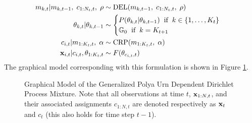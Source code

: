 \documentclass[twocolumn, final]{svjour3}
\begin{document}
\begin{align}
\label{gpuddpm_def}
\begin{split}
m_{k,t} | m_{k,t-1}, \hspace{1mm} c_{1:N_{t}, t}, \hspace{1mm} \rho  &\sim \text{DEL}(m_{k,t-1}, \hspace{1mm} c_{1:N_{t}, t}, \hspace{1mm} \rho) \\
\theta_{k, t} | \theta_{k, t-1}   &\sim
\begin{cases}
	P(\theta_{k, t} | \theta_{k, t-1}) \hspace{2mm} \text{if} \hspace{2mm} k \in \{ 1, \ldots, K_{t} \} \\
	\mathbb{G}_{0}   \hspace{2mm} \text{if} \hspace{2mm} k = K_{t+1}
\end{cases} \\
c_{i,t} | m_{1:K_{t},t}, \hspace{1mm} \alpha  &\sim  \text{CRP} (m_{1:K_{t},t}, \hspace{1mm} \alpha) \\
\bold{x}_{i,t} | c_{i,t}, \theta_{1:K_{t}, t} &\sim F(\theta_{c_{i,t}, t})
\end{split}
\end{align}
The graphical model corresponding with this formulation is shown in Figure \ref{fig:gpuddpm_gm_1}.
\begin{figure}[h]
        \caption{\label{fig:gpuddpm_gm_1} Graphical Model of the Generalized Polya Urn Dependent Dirichlet Process Mixture. Note that all observations at time $t$, $\bold{x}_{1:N,t}$, and their associated assignments $c_{1:N,t}$ are denoted respectively as $\bold{x}_{t}$ and $c_{t}$ (this also holds for time step $t-1$).}
\end{figure}
\end{document}
